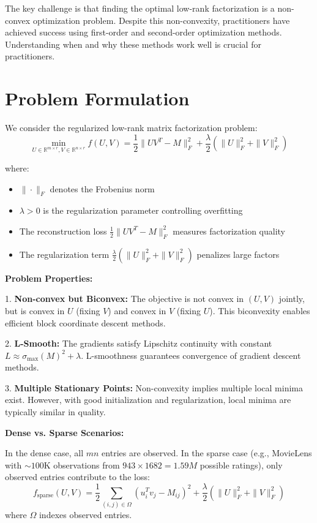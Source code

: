 \documentclass[11pt,a4paper]{article}
\begin{document}
The key challenge is that finding the optimal low-rank factorization is a non-convex optimization problem. Despite this non-convexity, practitioners have achieved success using first-order and second-order optimization methods. Understanding when and why these methods work well is crucial for practitioners.

\section{Problem Formulation}

We consider the regularized low-rank matrix factorization problem:
\begin{equation}
\min_{U \in \mathbb{R}^{m \times r}, V \in \mathbb{R}^{n \times r}} 
f(U, V) = \frac{1}{2}\|UV^T - M\|_F^2 + \frac{\lambda}{2}(\|U\|_F^2 + \|V\|_F^2)
\label{eq:main_objective}
\end{equation}

where:
\begin{itemize}
  \item $\|\cdot\|_F$ denotes the Frobenius norm
  \item $\lambda > 0$ is the regularization parameter controlling overfitting
  \item The reconstruction loss $\frac{1}{2}\|UV^T - M\|_F^2$ measures factorization quality
  \item The regularization term $\frac{\lambda}{2}(\|U\|_F^2 + \|V\|_F^2)$ penalizes large factors
\end{itemize}

\textbf{Problem Properties:}

1. \textbf{Non-convex but Biconvex:} The objective is not convex in $(U, V)$ jointly, but is convex in $U$ (fixing $V$) and convex in $V$ (fixing $U$). This biconvexity enables efficient block coordinate descent methods.

2. \textbf{L-Smooth:} The gradients satisfy Lipschitz continuity with constant $L \approx \sigma_{\max}(M)^2 + \lambda$. L-smoothness guarantees convergence of gradient descent methods.

3. \textbf{Multiple Stationary Points:} Non-convexity implies multiple local minima exist. However, with good initialization and regularization, local minima are typically similar in quality.

\textbf{Dense vs. Sparse Scenarios:}

In the dense case, all $mn$ entries are observed. In the sparse case (e.g., MovieLens with $\sim 100$K observations from $943 \times 1682 = 1.59M$ possible ratings), only observed entries contribute to the loss:
\begin{equation}
f_{\text{sparse}}(U, V) = \frac{1}{2}\sum_{(i,j) \in \Omega} (u_i^T v_j - M_{ij})^2 + \frac{\lambda}{2}(\|U\|_F^2 + \|V\|_F^2)
\end{equation}
where $\Omega$ indexes observed entries.
\end{document}

